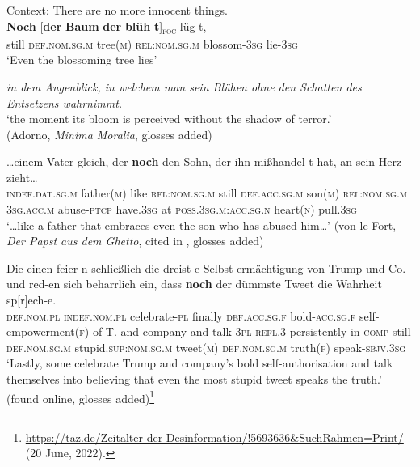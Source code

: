 \begin{exe}
	\ex\label{appendixGermanScalarAdditive1}
	Context: There are no more innocent things.\\
	\gll \textbf{Noch} \textup{[}\textbf{der} \textbf{Baum} \textbf{der} \textbf{blüh}-\textbf{t}\textup{]\textsubscript{\textsc{foc}}} lüg-t,\\
	still \phantom{[}\textsc{def}.\textsc{nom}.\textsc{sg}.\textsc{m} tree(\textsc{m}) \textsc{rel}:\textsc{nom}.\textsc{sg}.\textsc{m} blossom-3\textsc{sg} lie-3\textsc{sg}\\
	\glt \lq Even the blossoming tree lies\rq{}

	\sn 
\textit{in dem Augenblick, in welchem man sein Blühen ohne den Schatten des Entsetzens wahrnimmt.}\\	
	\lq the moment its bloom is perceived without the shadow of terror.'
	\\(Adorno, \textit{Minima Moralia}, glosses added)
	
	\ex\label{appendixGermanScalarAdditive2}
	\gll …einem Vater gleich, der \textbf{noch} den Sohn, der ihn mißhandel-t hat, an sein Herz zieht…\\
	\phantom{…}\textsc{indef}.\textsc{dat}.\textsc{sg}.\textsc{m} father(\textsc{m}) like \textsc{rel}:\textsc{nom}.\textsc{sg}.\textsc{m} still \textsc{def}.\textsc{acc}.\textsc{sg}.\textsc{m} son(\textsc{m}) \textsc{rel}:\textsc{nom}.\textsc{sg}.\textsc{m} 3\textsc{sg}.\textsc{acc}.\textsc{m} abuse-\textsc{ptcp} have.3\textsc{sg} at \textsc{poss}.3\textsc{sg}.\textsc{m}:\textsc{acc}.\textsc{sg}.\textsc{n} heart(\textsc{n}) pull.3\textsc{sg}\\
	\glt \lq …like a father that embraces even the son who has abused him…' 	(von le Fort, \textit{Der Papst aus dem Ghetto}, cited in \cite[s.v. \textit{noch}]{DWDS}, glosses added)
	
	\ex
	
\gll Die einen feier-n schließlich die dreist-e Selbst-ermächtigung von Trump und Co. und red-en sich beharrlich ein, dass \textbf{noch} der dümmste Tweet die Wahrheit sp[r]ech-e.\label{appendixGermanScalarAdditive3}\\
\textsc{def}.\textsc{nom}.\textsc{pl} \textsc{indef}.\textsc{nom}.\textsc{pl} celebrate-\textsc{pl} finally \textsc{def}.\textsc{acc}.\textsc{sg}.\textsc{f} bold-\textsc{acc}.\textsc{sg}.\textsc{f} self-empowerment(\textsc{f}) of T. and company and talk-3\textsc{pl} \textsc{refl}.3 persistently in \textsc{comp} still \textsc{def}.\textsc{nom}.\textsc{sg}.\textsc{m} stupid.\textsc{sup}:\textsc{nom}.\textsc{sg}.\textsc{m} tweet(\textsc{m}) \textsc{def}.\textsc{nom}.\textsc{sg}.\textsc{m} truth(\textsc{f}) speak-\textsc{sbjv}.3\textsc{sg}\\
\glt \lq Lastly, some celebrate Trump and company's bold self-authorisation and talk themselves into believing that even the most stupid tweet speaks the truth.' (found online, glosses added)\footnote{\url{https://taz.de/Zeitalter-der-Desinformation/!5693636&SuchRahmen=Print/} (20 June, 2022).} \end{exe}

